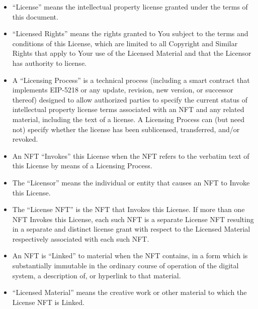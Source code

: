 \documentclass{article}
\newcommand{\eiplicense}{EIP-5218\xspace}
\newcommand{\subsect}[1]{\vspace{12pt}\noindent{\em{#1}}}
\begin{document}
\begin{sffamily}
\begin{itemize}
	\item	``License'' means the intellectual property license granted under the terms of this document.
		
	\item	``Licensed Rights'' means the rights granted to You subject to the terms and conditions of this License, which are limited to all Copyright and Similar Rights that apply to Your use of the Licensed Material and that the Licensor has authority to license.

	\item	A ``Licensing Process'' is a technical process (including a smart contract that implements \eiplicense or any update, revision, new version, or successor thereof) designed to allow authorized parties to specify the current status of intellectual property license terms associated with an NFT and any related material, including the text of a license. A Licensing Process can (but need not) specify whether the license has been sublicensed, transferred, and/or revoked.

	\item	An NFT ``Invokes'' this License when the NFT refers to the verbatim text of this License by means of a Licensing Process.
		
	\item	The ``Licensor'' means the individual or entity that causes an NFT to Invoke this License.
		
	\item	The ``License NFT'' is the NFT that Invokes this License. If more than one NFT Invokes this License, each such NFT is a separate License NFT resulting in a separate and distinct license grant with respect to the Licensed Material respectively associated with each such NFT.
		
	\end{itemize}
		
	\subsect{Licensed and Adapted Material}

	\begin{itemize}
	
	\item	An NFT is ``Linked'' to material when the NFT contains, in a form which is substantially immutable in the ordinary course of operation of the digital system, a description of, or hyperlink to that material.

	\item	``Licensed Material'' means the creative work or other material to which the License NFT is Linked.


\end{itemize}
\end{sffamily}
\end{document}
